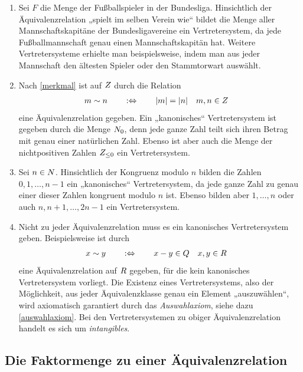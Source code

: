 \begin{bsp}[*] \quad
    \begin{enumerate}
        \item Sei $F$ die Menge der Fußballspieler in der Bundesliga. Hinsichtlich der Äquivalenzrelation „spielt im selben Verein wie“ bildet die Menge aller Mannschaftskapitäne der Bundesligavereine ein Vertretersystem, da jede Fußballmannschaft genau einen Mannschaftskapitän hat. Weitere Vertretersysteme erhielte man beispielsweise, indem man aus jeder Mannschaft den ältesten Spieler oder den Stammtorwart auswählt.
        \item Nach \cref{merkmal} ist auf $\relax Z$ durch die Relation
        \begin{align*}
            m\sim n\qquad&:\Leftrightarrow\qquad \vert m\vert=\vert n\vert && m,n\in \relax Z
        \end{align*}
        eine Äquivalenzrelation gegeben. Ein „kanonisches“ Vertretersystem ist gegeben durch die Menge $\relax N_0$, denn jede ganze Zahl teilt sich ihren Betrag mit genau einer natürlichen Zahl. Ebenso ist aber auch die Menge der nichtpositiven Zahlen $\relax Z_{\le 0}$ ein Vertretersystem.
        \item Sei $n\in \relax N$. Hinsichtlich der Kongruenz modulo $n$ bilden die Zahlen $0,1,\dots , n-1$ ein „kanonisches“ Vertretersystem, da jede ganze Zahl zu genau einer dieser Zahlen kongruent modulo $n$ ist. Ebenso bilden aber $1,\dots , n$ oder auch $n,n+1,\dots , 2n-1$ ein Vertretersystem.
        \item Nicht zu jeder Äquivalenzrelation muss es ein kanonisches Vertretersystem geben. Beispielsweise ist durch
        \begin{align*}
            x\sim y \qquad&:\Leftrightarrow\qquad x-y\in \relax Q && x,y\in \relax R
        \end{align*}
        eine Äquivalenzrelation auf $\relax R$ gegeben, für die kein kanonisches Vertretersystem vorliegt. Die Existenz eines Vertretersystems, also der Möglichkeit, aus jeder Äquivalenzklasse genau ein Element „auszuwählen“, wird axiomatisch garantiert durch das \emph{Auswahlaxiom}, siehe dazu \cref{auswahlaxiom}. Bei den Vertretersystemen zu obiger Äquivalenzrelation handelt es sich um \emph{intangibles}.
    \end{enumerate}
\end{bsp}





\subsection*{Die Faktormenge zu einer Äquivalenzrelation}


